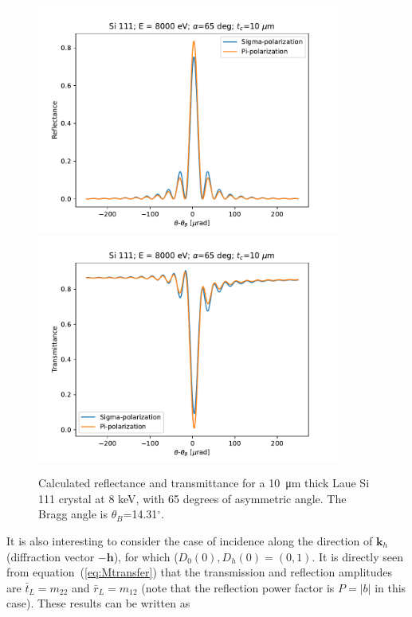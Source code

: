 \documentclass[preprint]{iucr}              %
\begin{document}
\begin{figure}\label{fig:laueProfiles}
    \centering
    \includegraphics[width=0.89\textwidth]{figures/Laue_1.pdf}
    \includegraphics[width=0.89\textwidth]{figures/Laue_2.pdf}
    \caption{Calculated reflectance and transmittance for a \SI{10}{\micro\meter} thick Laue Si 111 crystal at 8 keV, with 65 degrees of asymmetric angle. The Bragg angle is $\theta_B$=14.31$^\circ$.}
\end{figure}

It is also interesting to consider the case of incidence along the direction of $\textbf{k}_h$ (diffraction vector $-\textbf{h}$), for which ($D_0(0), D_h(0)=(0,1)$. It is directly seen from equation~(\ref{eq:Mtransfer}) that the transmission and reflection amplitudes are $\bar{t}_L=m_{22}$ and $\bar{r}_L=m_{12}$ (note that the reflection power factor is $P=|b|$ in this case). These results can be written as
\end{document}

